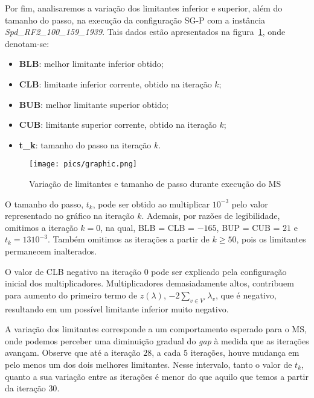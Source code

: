 \documentclass[12pt, a4paper]{article}
\theoremstyle{plain}
\theoremstyle{definition}
\theoremstyle{remark}
\begin{document}
Por fim, analisaremos a variação dos limitantes inferior e superior, além do tamanho do passo, na execução da configuração SG-P com a instância \textit{Spd\_RF2\_100\_159\_1939}. Tais dados estão apresentados na figura~\ref{fig:graphic}, onde denotam-se:

\begin{itemize}[before=\vspace{\baselineskip},after=\vspace{\baselineskip}]
\item \textbf{BLB}: melhor limitante inferior obtido;
\item \textbf{CLB}: limitante inferior corrente, obtido na iteração $k$;
\item \textbf{BUB}: melhor limitante superior obtido;
\item \textbf{CUB}: limitante superior corrente, obtido na iteração $k$;
\item \textbf{t\_k}: tamanho do passo na iteração $k$.
\end{itemize}

\begin{figure}[H]
\centering     %
\caption{Variação de limitantes e tamanho de passo durante execução do MS} \label{fig:graphic} 
\texttt{[image: pics/graphic.png]}
\end{figure}

O tamanho do passo, $t_k$, pode ser obtido ao multiplicar $10^{-3}$ pelo valor representado no gráfico na iteração $k$. Ademais, por razões de legibilidade, omitimos a iteração $k = 0$, na qual, BLB = CLB = $-165$, BUP = CUB = $21$ e $t_k = 13 10^{-3}$. Também omitimos as iterações a partir de $k \geq 50$, pois os limitantes permanecem inalterados.

O valor de CLB negativo na iteração $0$ pode ser explicado pela configuração inicial dos multiplicadores. Multiplicadores demasiadamente altos, contribuem para aumento do primeiro termo de $z(\lambda)$, $-2 \sum_{v \in V'} \lambda_v$, que é negativo, resultando em um possível limitante inferior muito negativo.

A variação dos limitantes corresponde a um comportamento esperado para o MS, onde podemos perceber uma diminuição gradual do \textit{gap} à medida que as iterações avançam. Observe que até a iteração $28$, a cada $5$ iterações, houve mudança em pelo menos um dos dois melhores limitantes. Nesse intervalo, tanto o valor de $t_k$, quanto a sua variação entre as iterações é menor do que aquilo que temos a partir da iteração $30$.
\end{document}
